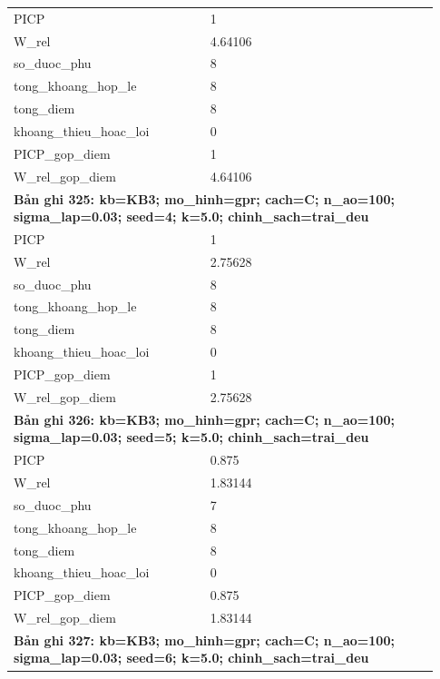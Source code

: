 \begin{longtable}{p{0.43\linewidth}p{0.50\linewidth}}
PICP & 1 \\
W\_\allowbreak rel & 4.64106 \\
so\_\allowbreak duoc\_\allowbreak phu & 8 \\
tong\_\allowbreak khoang\_\allowbreak hop\_\allowbreak le & 8 \\
tong\_\allowbreak diem & 8 \\
khoang\_\allowbreak thieu\_\allowbreak hoac\_\allowbreak loi & 0 \\
PICP\_\allowbreak gop\_\allowbreak diem & 1 \\
W\_\allowbreak rel\_\allowbreak gop\_\allowbreak diem & 4.64106 \\
\midrule
\multicolumn{2}{p{0.95\linewidth}}{\textbf{Bản ghi 325: kb=KB3; mo\_hinh=gpr; cach=C; n\_ao=100; sigma\_lap=0.03; seed=4; k=5.0; chinh\_sach=trai\_deu}} \\
PICP & 1 \\
W\_\allowbreak rel & 2.75628 \\
so\_\allowbreak duoc\_\allowbreak phu & 8 \\
tong\_\allowbreak khoang\_\allowbreak hop\_\allowbreak le & 8 \\
tong\_\allowbreak diem & 8 \\
khoang\_\allowbreak thieu\_\allowbreak hoac\_\allowbreak loi & 0 \\
PICP\_\allowbreak gop\_\allowbreak diem & 1 \\
W\_\allowbreak rel\_\allowbreak gop\_\allowbreak diem & 2.75628 \\
\midrule
\multicolumn{2}{p{0.95\linewidth}}{\textbf{Bản ghi 326: kb=KB3; mo\_hinh=gpr; cach=C; n\_ao=100; sigma\_lap=0.03; seed=5; k=5.0; chinh\_sach=trai\_deu}} \\
PICP & 0.875 \\
W\_\allowbreak rel & 1.83144 \\
so\_\allowbreak duoc\_\allowbreak phu & 7 \\
tong\_\allowbreak khoang\_\allowbreak hop\_\allowbreak le & 8 \\
tong\_\allowbreak diem & 8 \\
khoang\_\allowbreak thieu\_\allowbreak hoac\_\allowbreak loi & 0 \\
PICP\_\allowbreak gop\_\allowbreak diem & 0.875 \\
W\_\allowbreak rel\_\allowbreak gop\_\allowbreak diem & 1.83144 \\
\midrule
\multicolumn{2}{p{0.95\linewidth}}{\textbf{Bản ghi 327: kb=KB3; mo\_hinh=gpr; cach=C; n\_ao=100; sigma\_lap=0.03; seed=6; k=5.0; chinh\_sach=trai\_deu}} \\

\end{longtable}

